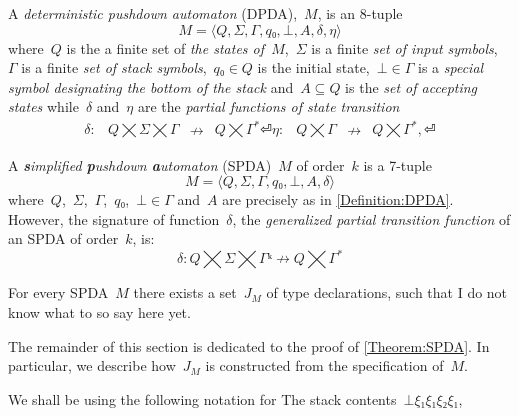 \begin{Definition}
  \label{Definition:DPDA}
  A \emph{deterministic pushdown automaton} (DPDA),~$M$, is an 8-tuple
  \[
    M =⟨Q,Σ,Γ, q₀,⊥, A,δ,η⟩
  \]
  where~$Q$ is the a finite set of
  \emph{the states of~$M$},~$Σ$ is a finite
  \emph{set of input symbols},~$Γ$ is a finite
  \emph{set of stack symbols},~$q₀∈Q$ is the initial state,~$⊥∈Γ$
  is a \emph{special symbol designating the bottom of the stack}
  and~$A⊆Q$ is the \emph{set of accepting states} while~$δ$ and~$η$ are
  the \emph{partial functions of state transition}
  \[
    \begin{array}{crlc}
      δ: & Q⨉Σ⨉Γ &↛& Q⨉Γ^*⏎
      η: & Q⨉Γ &↛& Q⨉Γ^*,⏎
    \end{array}
  \]
\end{Definition}

\begin{Definition}
  \label{Definition:SPDA}
  A \emph{\textbf simplified \textbf pushdown \textbf automaton} (SPDA)~$M$ of order~$k$ is a 7-tuple
  \[
    M =⟨Q,Σ,Γ,q₀,⊥, A,δ⟩
  \]
  where~$Q$,~$Σ$,~$Γ$,~$q₀$,~$⊥∈Γ$ and~$A$ are precisely as in \cref{Definition:DPDA}.
  However, the signature of function~$δ$, the \emph{generalized partial transition function}
  of an SPDA of order~$k$, is:
  \begin{equation}
    \label{Equation:generalized:transition}
      δ: Q⨉Σ⨉Γᵏ↛Q⨉Γ^*
    \end{equation}
\end{Definition}

\begin{Theorem}
  \label{Theorem:SPDA}
  For every SPDA~$M$ there exists a set~$J_M$ of \Java type declarations, such that
    I do not know what to so say here yet.
\end{Theorem}

\begin{figure}[b]
  \begin{adjustbox}{max width=0.6\linewidth}
    
  \end{adjustbox}
\end{figure}

The remainder of this section is dedicated to the proof of \cref{Theorem:SPDA}.
In particular, we describe how~$J_M$ is constructed from the
  specification of~$M$.

We shall be using the following notation for
The stack contents~$⊥ξ₁ξ₁ξ₂ξ₁$,

